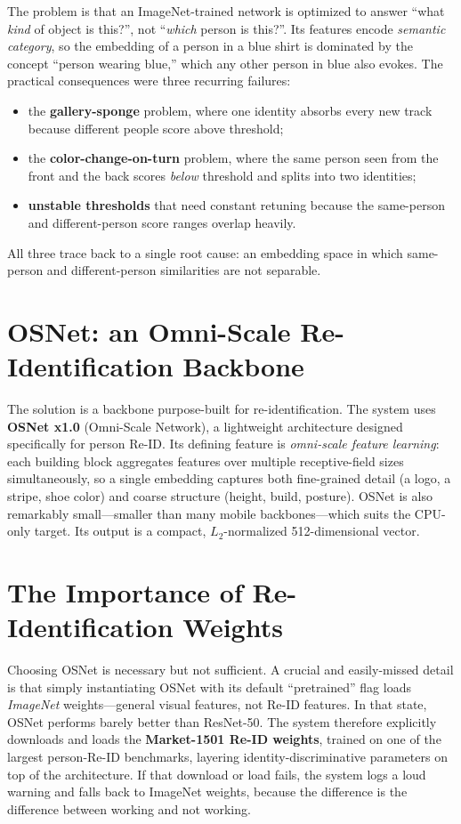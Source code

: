 \documentclass[12pt]{report}
\begin{document}
The problem is that an ImageNet-trained network is optimized to answer ``what \emph{kind} of object is this?'', not ``\emph{which} person is this?''. Its features encode \emph{semantic category}, so the embedding of a person in a blue shirt is dominated by the concept ``person wearing blue,'' which any other person in blue also evokes. The practical consequences were three recurring failures:
\begin{itemize}
    \item the \textbf{gallery-sponge} problem, where one identity absorbs every new track because different people score above threshold;
    \item the \textbf{color-change-on-turn} problem, where the same person seen from the front and the back scores \emph{below} threshold and splits into two identities;
    \item \textbf{unstable thresholds} that need constant retuning because the same-person and different-person score ranges overlap heavily.
\end{itemize}
All three trace back to a single root cause: an embedding space in which same-person and different-person similarities are not separable.

\section{OSNet: an Omni-Scale Re-Identification Backbone}
The solution is a backbone purpose-built for re-identification. The system uses \textbf{OSNet x1.0} (Omni-Scale Network), a lightweight architecture designed specifically for person Re-ID. Its defining feature is \emph{omni-scale feature learning}: each building block aggregates features over multiple receptive-field sizes simultaneously, so a single embedding captures both fine-grained detail (a logo, a stripe, shoe color) and coarse structure (height, build, posture). OSNet is also remarkably small---smaller than many mobile backbones---which suits the CPU-only target. Its output is a compact, $L_2$-normalized 512-dimensional vector.

\section{The Importance of Re-Identification Weights}
Choosing OSNet is necessary but not sufficient. A crucial and easily-missed detail is that simply instantiating OSNet with its default ``pretrained'' flag loads \emph{ImageNet} weights---general visual features, not Re-ID features. In that state, OSNet performs barely better than ResNet-50. The system therefore explicitly downloads and loads the \textbf{Market-1501 Re-ID weights}, trained on one of the largest person-Re-ID benchmarks, layering identity-discriminative parameters on top of the architecture. If that download or load fails, the system logs a loud warning and falls back to ImageNet weights, because the difference is the difference between working and not working.
\end{document}
